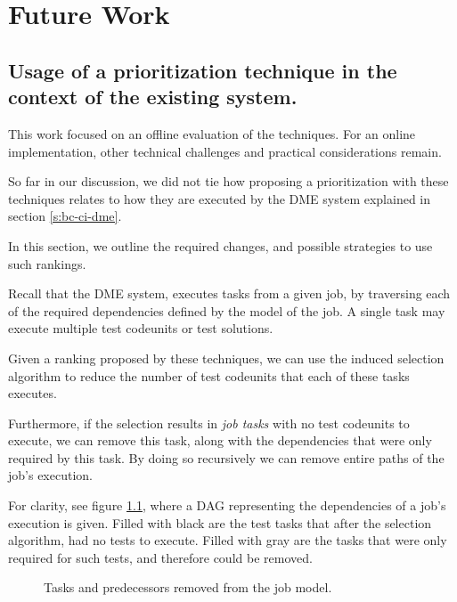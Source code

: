 \chapter{Future Work}\label{s:future}

\section{Usage of a prioritization technique in the context of the existing system.}

This work focused on an offline evaluation of the techniques. For an online implementation,
other technical challenges and practical considerations remain.

So far in our discussion, we did not tie how proposing a prioritization
with these techniques relates to how they are executed by the DME system explained
in section \ref{s:bc-ci-dme}.

In this section, we outline the required changes, and possible strategies to use
such rankings.

Recall that the DME system, executes tasks from a given job, by
traversing each of the required dependencies defined by the model of the job. 
A single task may execute multiple test codeunits or test solutions. 

Given a ranking proposed by these techniques, we can use the induced selection
algorithm to reduce the number of test codeunits that each of these tasks executes.

Furthermore, if the selection results in \emph{job tasks} with no test codeunits to
execute, we can remove this task, along with the dependencies that were 
only required by this task. By doing so recursively we can remove entire paths of the
job's execution.

For clarity, see figure \ref{f:conc-fut-dag-removingtask}, where a DAG representing the dependencies of a job's 
execution is given. Filled with black are the test tasks that after the selection
algorithm, had no tests to execute. Filled with gray are the tasks that were only
required for such tests, and therefore could be removed.

\begin{figure}
    \centering
    \def\svgwidth{0.5\columnwidth}
    
    \caption{Tasks and predecessors removed from the job model.}
    \label{f:conc-fut-dag-removingtask}
\end{figure}

